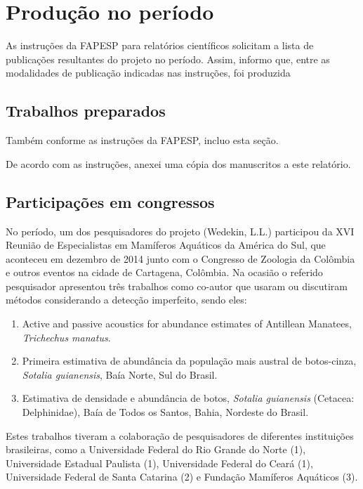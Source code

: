 \section{Produção no período} %
As instruções da FAPESP para relatórios científicos solicitam a lista de publicações resultantes do projeto no período.
Assim, informo que, entre as modalidades de publicação indicadas nas instruções, foi produzida 


\subsection{Trabalhos preparados} %
Também conforme as instruções da FAPESP, incluo esta seção. 


De acordo com as instruções, anexei uma cópia dos manuscritos a este relatório.

\subsection{Participações em congressos} %

No período, um dos pesquisadores do projeto (Wedekin, L.L.) participou da XVI Reunião de Especialistas em Mamíferos Aquáticos da América do Sul, que aconteceu em dezembro de 2014 junto com o Congresso de Zoologia da Colômbia e outros eventos na cidade de Cartagena, Colômbia. Na ocasião o referido pesquisador apresentou três trabalhos como co-autor que usaram ou discutiram métodos considerando a detecção imperfeito, sendo eles:

\begin{enumerate}
\item Active and passive acoustics for abundance estimates of Antillean Manatees, \textit{Trichechus manatus}.
\item Primeira estimativa de abundância da população mais austral de botos-cinza, \textit{Sotalia guianensis}, Baía Norte, Sul do Brasil.
\item Estimativa de densidade e abundância de botos, \textit{Sotalia guianensis} (Cetacea: Delphinidae), Baía de Todos os Santos, Bahia, Nordeste do Brasil.
\end{enumerate}

Estes trabalhos tiveram a colaboração de pesquisadores de diferentes instituições brasileiras, como a Universidade Federal do Rio Grande do Norte (1), Universidade Estadual Paulista (1), Universidade Federal do Ceará (1), Universidade Federal de Santa Catarina (2) e Fundação Mamíferos Aquáticos (3).